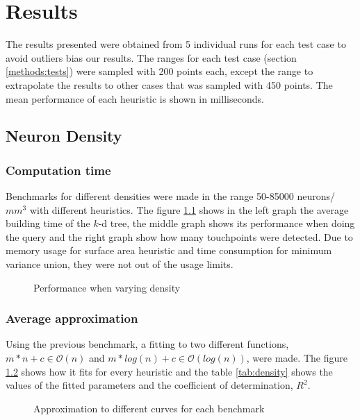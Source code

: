\chapter{Results}
\label{chapter:results}
The results presented were obtained from 5 individual runs for each test case to avoid outliers bias our results. The ranges for each test case (section \ref{methods:tests}) were sampled with 200 points each, except the range to extrapolate the results to other cases that was sampled with 450 points. The mean performance of each heuristic is shown in milliseconds.

\section{Neuron Density}
\subsection{Computation time}
Benchmarks for different densities were made in the range 50-85000 neurons/$mm^3$ with different heuristics. The figure \ref{fig:density} shows in the left graph the average building time of the $k$-d tree, the middle graph shows its performance when doing the query and the right graph show how many touchpoints were detected. Due to memory usage for surface area heuristic and time consumption for minimum variance union, they were not out of the usage limits.
\begin{figure}[h!]
  \centering
  
  \caption{Performance when varying density}
  \label{fig:density}
\end{figure}

\subsection{Average approximation}
Using the previous benchmark, a fitting to two different functions, $m*n+c \in \mathcal{O}(n)$ and $m*log(n)+c \in \mathcal{O}(log(n))$, were made. The figure \ref{fig:approx_density} shows how it fits for every heuristic and the table \ref{tab:density} shows the values of the fitted parameters and the coefficient of determination, $R^2$.
\begin{figure}[h!]
  \centering
  
  \caption{Approximation to different curves for each benchmark}
  \label{fig:approx_density}
\end{figure}


